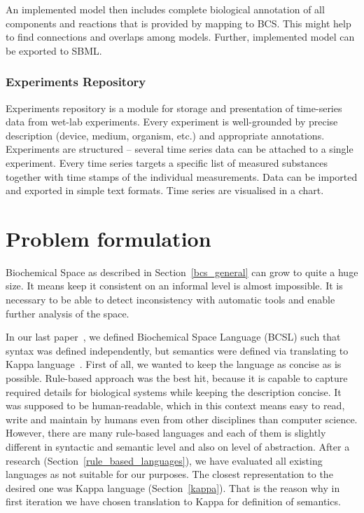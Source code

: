 \documentclass[12pt]{fithesis2}
\begin{document}
An implemented model then includes complete biological annotation of all components and reactions that is provided by mapping to BCS. This might help to find connections and overlaps among models. Further, implemented model can be exported to SBML.

\subsection{Experiments Repository}

Experiments repository is a module for storage and presentation of time-series data from wet-lab experiments. Every experiment is well-grounded by precise description (device, medium, organism, etc.) and appropriate annotations. Experiments are structured -- several time series data can be attached to a single experiment. Every time series targets a specific list of measured substances together with time stamps of the individual measurements. Data can be imported and exported in simple text formats. Time series are visualised in a chart.	

\chapter{Problem formulation}
\label{problem_formulation}

Biochemical Space as described in Section~\ref{bcs_general} can grow to quite a huge size. It means keep it consistent on an informal level is almost impossible. It is necessary to be able to detect inconsistency with automatic tools and enable further analysis of the space.

In our last paper~\cite{Ded201627}, we defined Biochemical Space Language (BCSL) such that syntax was defined independently, but semantics were defined via translating to Kappa language~\cite{kappa_formal}. First of all, we wanted to keep the language as concise as is possible. Rule-based approach was the best hit, because it is capable to capture required details for biological systems while keeping the description concise. It was supposed to be human-readable, which in this context means easy to read, write and maintain by humans even from other disciplines than computer science. However, there are many rule-based languages and each of them is slightly different in syntactic and semantic level and also on level of abstraction. After a research (Section~\ref{rule_based_languages}), we have evaluated all existing languages as not suitable for our purposes. The closest representation to the desired one was Kappa language (Section~\ref{kappa}). That is the reason why in first iteration we have chosen translation to Kappa for definition of semantics.
\end{document}
